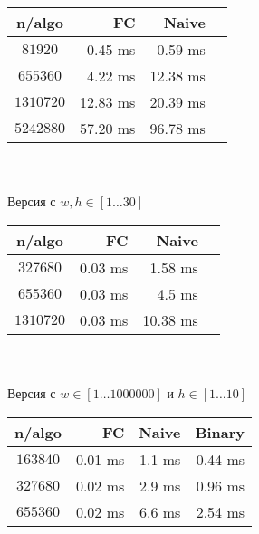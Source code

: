 \documentclass[a4paper,12pt]{article}
\begin{document}
\vspace{1em}
\begin{tabular}{|c|r|r|r|}
\hline
n/algo & FC & Naive \\
\hline
$81920$ & 0.45 ms & 0.59 ms \\
\hline
$655360$ & 4.22 ms & 12.38 ms \\
\hline
$1310720$ & 12.83 ms & 20.39 ms \\
\hline
$5242880$ & 57.20 ms & 96.78 ms \\
\hline
\end{tabular}
\\
\\ Версия с $w, h \in [1 \dots 30]$
\\
\begin{tabular}{|c|r|r|r|}
\hline
n/algo & FC & Naive \\
\hline
$327680$ & 0.03 ms & 1.58 ms \\
\hline
$655360$ & 0.03 ms & 4.5 ms \\
\hline
$1310720$ & 0.03 ms & 10.38 ms \\
\hline
\end{tabular}
\\
\\ Версия с $w \in [1 \dots 1000000]$ и $h \in [1 \dots 10]$
\\
\begin{tabular}{|c|r|r|r|}
\hline
n/algo & FC & Naive & Binary \\
\hline
$163840$ & 0.01 ms & 1.1 ms & 0.44 ms\\
\hline
$327680$ & 0.02 ms & 2.9 ms & 0.96 ms\\
\hline
$655360$ & 0.02 ms & 6.6 ms & 2.54 ms\\
\hline
\end{tabular}
\end{document}

